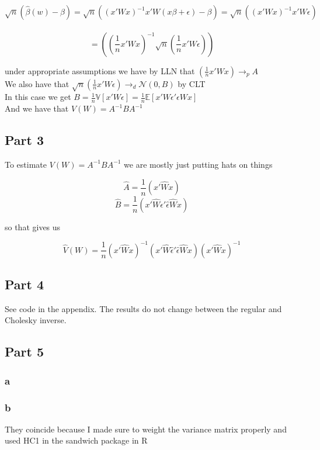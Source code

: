 \documentclass[11pt]{article}
\newcommand{\plim}{\rightarrow_{p}}
\begin{document}
$$ \sqrt{n} (\hat{\beta}(w)- \beta) = \sqrt{n}((x'Wx)^{-1}x'W(x\beta+\epsilon)-\beta)  
= \sqrt{n}((x'Wx)^{-1}x'W \epsilon)$$ \\
$$ = ((\frac{1}{n}x'Wx)^{-1} \sqrt{n} (\frac{1}{n} x'W\epsilon))$$

under appropriate assumptions we have by LLN that $ (\frac{1}{n}x'Wx) \plim A $ \\
We also have that $  \sqrt{n} (\frac{1}{n} x'W\epsilon) \rightarrow_{d} \mathcal{N}(0,B)$ by CLT  \\
In this case we get $ B = \frac{1}{n}  \mathbb{V}[x'W\epsilon] = \frac{1}{n} \mathbb{E}[x'W\epsilon'\epsilon Wx] $\\
And we have that $ V(W) = A^{-1}BA^{-1} $
 
\subsection{Part 3}

To estimate $V(W) = A^{-1}BA^{-1} $ we are mostly just putting hats on things 

$$\hat{A} = \frac{1}{n}(x'\hat{W}x)$$ 
$$\hat{B} = \frac{1}{n}(x'\hat{W} \hat{\epsilon}' \hat{\epsilon} \hat{W}x)$$

 so that gives us 
 
 $$ \hat{V}(W) = \frac{1}{n} (x'\hat{W}x)^{-1} (x'\hat{W} \hat{\epsilon}' \hat{\epsilon} \hat{W}x) (x'\hat{W}x)^{-1} $$
 
 \subsection{Part 4}
 
 See code in the appendix. The results do not change between the regular and Cholesky inverse. 
 
  \subsection{Part 5}
  
 	\subsubsection{a}
 	\begin{center}
 		
 	\end{center}
 
 	\subsubsection{b}
 	They coincide because I made sure to weight the variance matrix properly and used HC1 in the sandwich package in R
 		\begin{center}
 		
 	\end{center}
 	
\end{document}

